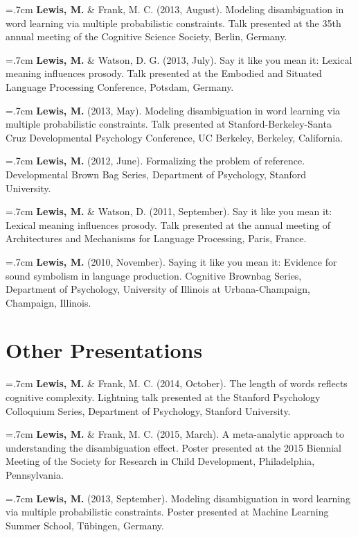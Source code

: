 \documentclass[letterpaper]{article}
\begin{document}
 \hangindent=.7cm {\bf Lewis, M.}  \& Frank, M. C.  (2013, August). Modeling disambiguation in word learning via multiple probabilistic constraints. Talk presented at the 35th annual meeting of the Cognitive Science Society, Berlin, Germany.
 
  \hangindent=.7cm {\bf Lewis, M.} \& Watson, D. G.  (2013, July). Say it like you mean it: Lexical meaning influences prosody. Talk presented at the Embodied and Situated Language Processing Conference, Potsdam, Germany.
 
 \hangindent=.7cm {\bf Lewis, M.} (2013, May). Modeling disambiguation in word learning via multiple probabilistic constraints. Talk presented at Stanford-Berkeley-Santa Cruz Developmental Psychology Conference, UC Berkeley, Berkeley, California.

\hangindent=.7cm {\bf Lewis, M.} (2012, June). Formalizing the problem of reference. Developmental Brown Bag Series, Department of Psychology, Stanford University.

 \hangindent=.7cm {\bf Lewis, M.}  \& Watson, D. (2011, September). Say it like you mean it: Lexical meaning influences prosody. Talk presented at the annual meeting of Architectures and Mechanisms for Language Processing, Paris, France.

\hangindent=.7cm {\bf Lewis, M.} (2010, November). Saying it like you mean it: Evidence for sound symbolism in language production. Cognitive Brownbag Series, Department of Psychology, University of Illinois at Urbana-Champaign, Champaign, Illinois. 

\section*{Other Presentations}
\hangindent=.7cm {\bf Lewis, M.} \& Frank, M. C. (2014, October). The length of words reflects cognitive complexity. Lightning talk presented at the Stanford Psychology Colloquium Series, Department of Psychology, Stanford University.

\hangindent=.7cm {\bf Lewis, M.} \& Frank, M. C. (2015, March). A meta-analytic approach to understanding the disambiguation effect. Poster presented at  the 2015 Biennial Meeting of the Society for Research in Child Development, Philadelphia, Pennsylvania.

 \hangindent=.7cm {\bf Lewis, M.} (2013, September). Modeling disambiguation in word learning via multiple probabilistic constraints. Poster presented at Machine Learning Summer School, T\"{u}bingen, Germany.
 
\end{document}
